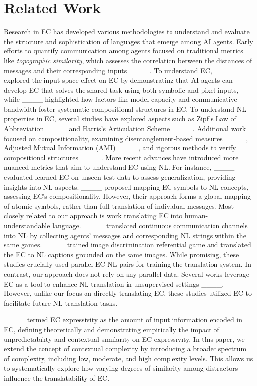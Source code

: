 \section{Related Work}
Research in EC has developed various methodologies to understand and evaluate the structure and sophistication of languages that emerge among AI agents. Early efforts to quantify communication among agents focused on traditional metrics like \textit{topographic similarity}, which assesses the correlation between the distances of messages and their corresponding inputs ____. To understand EC, ____ explored the input space effect on EC by demonstrating that AI agents can develop EC that solves the shared task using both symbolic and pixel inputs, while ____ highlighted how factors like model capacity and communicative bandwidth foster systematic compositional structures in EC.
To understand NL properties in EC, several studies have explored aspects such as Zipf's Law of Abbreviation ____ and Harris's Articulation Scheme ____. Additional work focused on compositionality, examining disentanglement-based measures ____, Adjusted Mutual Information (AMI) ____, and rigorous methods to verify compositional structures ____.
More recent advances have introduced more nuanced metrics that aim to understand EC using NL. For instance, ____ evaluated learned EC on unseen test data to assess generalization, providing insights into NL aspects. ____ proposed mapping EC symbols to NL concepts, assessing EC's compositionality. However, their approach forms a global mapping of atomic symbols, rather than full translation of individual messages.  Most closely related to our approach is work translating EC into human-understandable language.  ____  translated continuous communication channels into NL by collecting agents' messages and corresponding NL strings within the same games. ____ trained image discrimination referential game and translated the EC to NL captions grounded on the same images. While promising, these studies crucially used parallel EC-NL pairs for training the translation system. In contrast, our approach does not rely on any parallel data.
Several works leverage EC as a tool to enhance NL translation in unsupervised settings ____. However, unlike our focus on directly translating EC, these studies utilized EC to facilitate future NL translation tasks.

____ termed EC expressivity as the amount of input information encoded in EC, defining theoretically and demonstrating empirically the impact of unpredictability and contextual similarity on EC expressivity. In this paper, we extend the concept of contextual complexity by introducing  a broader spectrum of complexity, including low, moderate, and high complexity levels. This allows us to systematically explore how varying degrees of similarity among distractors influence the translatability of EC.